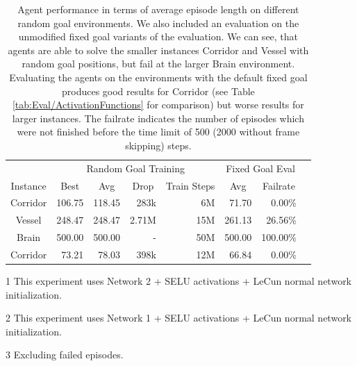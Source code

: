 \begin{table}[htp]
    \begin{center}
        \begin{threeparttable}
            \begin{tabular}{crrrrrrr}
                \toprule
                 & \multicolumn{4}{c}{Random Goal Training} & \multicolumn{2}{c}{Fixed Goal Eval} \\
                \cmidrule(lr){2-5} \cmidrule(lr){6-7}
                \multicolumn{1}{c}{Instance} & \multicolumn{1}{c}{Best} & \multicolumn{1}{c}{Avg} & \multicolumn{1}{c}{Drop} & \multicolumn{1}{c}{Train Steps} & \multicolumn{1}{c}{Avg} & \multicolumn{1}{c}{Failrate}\\
                \midrule
                Corridor\tnote{1} & 106.75 & 118.45 & 283k & 6M & 71.70 & 0.00\% \\
                Vessel\tnote{2} & 248.47 & 248.47 & 2.71M & 15M & 261.13\tnote{3} & 26.56\% \\
                Brain\tnote{1} & 500.00 & 500.00 & - & 50M &  500.00 & 100.00\%\\
                \midrule
                Corridor\tnote{2} & 73.21 & 78.03 & 398k & 12M & 66.84 & 0.00\% \\
                \bottomrule
            \end{tabular}
            \begin{tablenotes}
                \footnotesize
                \item[1] This experiment uses Network 2 + SELU activations + LeCun normal network initialization.
                \item[2] This experiment uses Network 1 + SELU activations + LeCun normal network initialization.
                \item[3] Excluding failed episodes. 
            \end{tablenotes}

        \end{threeparttable}
        \caption[Evaluation Results for Agents on Random Goal Environments]{Agent performance in terms of average episode length on different random goal environments. We also included an evaluation on the unmodified fixed goal variants of the evaluation. We can see, that agents are able to solve the smaller instances Corridor and Vessel with random goal positions, but fail at the larger Brain environment. Evaluating the agents on the environments with the default fixed goal produces good results for Corridor (see Table \ref{tab:Eval/ActivationFunctions} for comparison) but worse results for larger instances. The failrate indicates the number of episodes which were not finished before the time limit of 500 (2000 without frame skipping) steps.} \label{tab:Eval/RandomGoal/All}
    \end{center}
\end{table}


